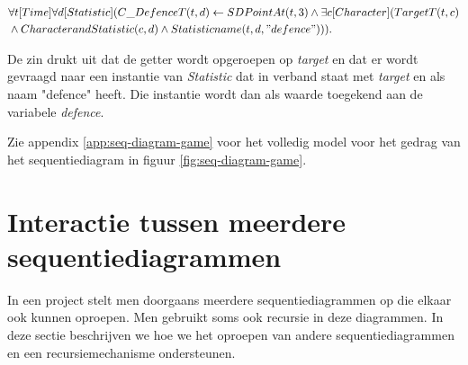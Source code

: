 \begin{align*}
	&\forall{t}[Time]\forall{d}[Statistic](C\_DefenceT(t, d) \leftarrow SDPointAt(t, 3) \land \exists{c}[Character](TargetT(t, c) \\ &\land CharacterandStatistic(c, d) \land Statisticname(t, d, "defence"))).
\end{align*}


De zin drukt uit dat de getter wordt opgeroepen op \textit{target} en dat er wordt gevraagd naar een instantie van \textit{Statistic} dat in verband staat met \textit{target} en als naam "defence" heeft. Die instantie wordt dan als waarde toegekend aan de variabele \textit{defence}.

Zie appendix \ref{app:seq-diagram-game} voor het volledig model voor het gedrag van het sequentiediagram in figuur \ref{fig:seq-diagram-game}.


\section{Interactie tussen meerdere sequentiediagrammen}\label{sec:interaction}
In een project stelt men doorgaans meerdere sequentiediagrammen op die elkaar ook kunnen oproepen. Men gebruikt soms ook recursie in deze diagrammen. In deze sectie beschrijven we hoe we het oproepen van andere sequentiediagrammen en een recursiemechanisme ondersteunen.


